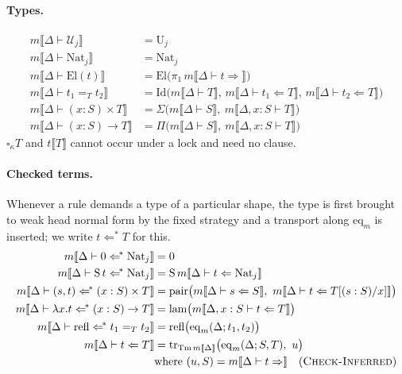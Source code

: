 \paragraph{Types.}
\begin{align*}
m\llbracket\Delta\vdash \mathcal U_j\rrbracket &=
    \mathrm U_j \\
m\llbracket\Delta\vdash \mathrm{Nat}_j\rrbracket &=
    \mathrm{Nat}_j\\
m\llbracket\Delta\vdash \mathrm{El}(t)\rrbracket &=
    \mathrm{El}\big(\pi_1\,m\llbracket\Delta\vdash
        t\Rightarrow\rrbracket\big) \\
m\llbracket\Delta\vdash t_1 =_T t_2\rrbracket &=
\mathrm{Id}\big(m\llbracket\Delta\vdash T\rrbracket,\,
m\llbracket\Delta\vdash t_1\Leftarrow T\rrbracket,\,
m\llbracket\Delta\vdash t_2\Leftarrow T\rrbracket\big)\\
m\llbracket\Delta\vdash (x:S)\times T\rrbracket &=
\Sigma\big(m\llbracket\Delta\vdash S\rrbracket,
\ m\llbracket\Delta,x:S\vdash T\rrbracket\big)\\
m\llbracket\Delta\vdash (x:S)\to T\rrbracket &=
\Pi\big(m\llbracket\Delta\vdash S\rrbracket,
\ m\llbracket\Delta,x:S\vdash T\rrbracket\big)
\end{align*}
$\square_\kappa T$ and $t\llbracket T\rrbracket$ cannot occur under a lock and need no clause.

\paragraph{Checked terms.} Whenever a rule demands a type of a particular shape, the type is first brought to weak head normal form by the fixed strategy and a transport along $\mathrm{eq}_m$ is inserted; we write $t \Leftarrow^{\!*} T$ for this.
\begin{align*}
m\llbracket\Delta\vdash 0 \Leftarrow^{\!*} \mathrm{Nat}_j\rrbracket &= 0 \\
m\llbracket\Delta\vdash \mathrm S\,t \Leftarrow^{\!*} \mathrm{Nat}_j\rrbracket &= \mathrm S\,m\llbracket\Delta\vdash t\Leftarrow \mathrm{Nat}_j\rrbracket\\
m\llbracket\Delta\vdash (s,t) \Leftarrow^{\!*} (x:S)\times T\rrbracket &= \mathrm{pair}\big(m\llbracket\Delta\vdash s\Leftarrow S\rrbracket,\ m\llbracket\Delta\vdash t\Leftarrow T[(s:S)/x]\rrbracket\big)\\
m\llbracket\Delta\vdash \lambda x.t \Leftarrow^{\!*} (x:S)\to T\rrbracket &= \mathrm{lam}\big(m\llbracket\Delta,x:S\vdash t\Leftarrow T\rrbracket\big)\\
m\llbracket\Delta\vdash \mathrm{refl} \Leftarrow^{\!*} t_1 =_T t_2\rrbracket &= \mathrm{refl}\big(\mathrm{eq}_m(\Delta; t_1, t_2)\big)\\
m\llbracket\Delta\vdash t \Leftarrow T\rrbracket &= \mathrm{tr}_{\mathrm{Tm}\,m\llbracket\Delta\rrbracket}\big(\mathrm{eq}_m(\Delta; S, T),\ u\big) \\
   &\text{where } (u,S)=m\llbracket\Delta\vdash t\Rightarrow\rrbracket \quad(\textsc{Check-Inferred})
\end{align*}

